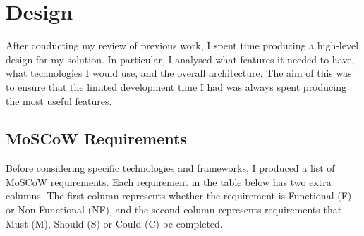 \chapter{Design}

After conducting my review of previous work, I spent time producing a high-level design for my solution. In particular, I analysed what features it needed to have, what technologies I would use, and the overall architecture. The aim of this was to ensure that the limited development time I had was always spent producing the most useful features.

\section{MoSCoW Requirements}

Before considering specific technologies and frameworks, I produced a list of MoSCoW requirements. Each requirement in the table below has two extra columns. The first column represents whether the requirement is Functional (F) or Non-Functional (NF), and the second column represents requirements that Must (M), Should (S) or Could (C) be completed.

